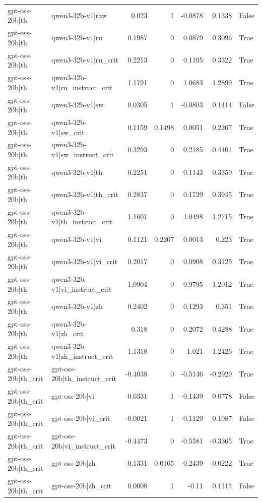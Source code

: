 \begin{table}
\begin{tabular}{l l r r r r l}
gpt-oss-20b|th & qwen3-32b-v1|raw & 0.023 & 1 & -0.0878 & 0.1338 & False \\
gpt-oss-20b|th & qwen3-32b-v1|ru & 0.1987 & 0 & 0.0879 & 0.3096 & True \\
gpt-oss-20b|th & qwen3-32b-v1|ru_crit & 0.2213 & 0 & 0.1105 & 0.3322 & True \\
gpt-oss-20b|th & qwen3-32b-v1|ru_instruct_crit & 1.1791 & 0 & 1.0683 & 1.2899 & True \\
gpt-oss-20b|th & qwen3-32b-v1|sw & 0.0305 & 1 & -0.0803 & 0.1414 & False \\
gpt-oss-20b|th & qwen3-32b-v1|sw_crit & 0.1159 & 0.1498 & 0.0051 & 0.2267 & True \\
gpt-oss-20b|th & qwen3-32b-v1|sw_instruct_crit & 0.3293 & 0 & 0.2185 & 0.4401 & True \\
gpt-oss-20b|th & qwen3-32b-v1|th & 0.2251 & 0 & 0.1143 & 0.3359 & True \\
gpt-oss-20b|th & qwen3-32b-v1|th_crit & 0.2837 & 0 & 0.1729 & 0.3945 & True \\
gpt-oss-20b|th & qwen3-32b-v1|th_instruct_crit & 1.1607 & 0 & 1.0498 & 1.2715 & True \\
gpt-oss-20b|th & qwen3-32b-v1|vi & 0.1121 & 0.2207 & 0.0013 & 0.223 & True \\
gpt-oss-20b|th & qwen3-32b-v1|vi_crit & 0.2017 & 0 & 0.0908 & 0.3125 & True \\
gpt-oss-20b|th & qwen3-32b-v1|vi_instruct_crit & 1.0904 & 0 & 0.9795 & 1.2012 & True \\
gpt-oss-20b|th & qwen3-32b-v1|zh & 0.2402 & 0 & 0.1293 & 0.351 & True \\
gpt-oss-20b|th & qwen3-32b-v1|zh_crit & 0.318 & 0 & 0.2072 & 0.4288 & True \\
gpt-oss-20b|th & qwen3-32b-v1|zh_instruct_crit & 1.1318 & 0 & 1.021 & 1.2426 & True \\
gpt-oss-20b|th_crit & gpt-oss-20b|th_instruct_crit & -0.4038 & 0 & -0.5146 & -0.2929 & True \\
gpt-oss-20b|th_crit & gpt-oss-20b|vi & -0.0331 & 1 & -0.1439 & 0.0778 & False \\
gpt-oss-20b|th_crit & gpt-oss-20b|vi_crit & -0.0021 & 1 & -0.1129 & 0.1087 & False \\
gpt-oss-20b|th_crit & gpt-oss-20b|vi_instruct_crit & -0.4473 & 0 & -0.5581 & -0.3365 & True \\
gpt-oss-20b|th_crit & gpt-oss-20b|zh & -0.1331 & 0.0165 & -0.2439 & -0.0222 & True \\
gpt-oss-20b|th_crit & gpt-oss-20b|zh_crit & 0.0008 & 1 & -0.11 & 0.1117 & False \\

\end{tabular}
\end{table}
